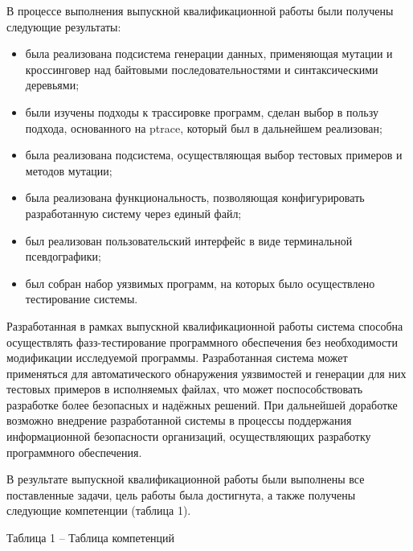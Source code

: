 \label{sec:conclusion}

В процессе выполнения выпускной квалификационной работы были получены следующие результаты:

\begin{itemize}
	\item была реализована подсистема генерации данных, применяющая мутации и кроссинговер над байтовыми последовательностями и синтаксическими деревьями;
	
	\item были изучены подходы к трассировке программ, сделан выбор в пользу подхода, основанного на ptrace, который был в дальнейшем реализован;
	
	\item была реализована подсистема, осуществляющая выбор тестовых примеров и методов мутации;
	
	\item была реализована функциональность, позволяющая конфигурировать разработанную систему через единый файл;
	
	\item был реализован пользовательский интерфейс в виде терминальной псевдографики;
	
	\item был собран набор уязвимых программ, на которых было осуществлено тестирование системы.
\end{itemize}

Разработанная в рамках выпускной квалификационной работы система способна осуществлять фазз-тестирование программного обеспечения без необходимости модификации исследуемой программы. Разработанная система  может применяться для автоматического обнаружения уязвимостей и генерации для них тестовых примеров в исполняемых файлах, что может поспособствовать разработке более безопасных и надёжных решений. При дальнейшей доработке возможно внедрение разработанной системы в процессы поддержания информационной безопасности организаций, осуществляющих разработку программного обеспечения.

В результате выпускной квалификационной работы были выполнены
все поставленные задачи, цель работы была достигнута, а также получены
следующие компетенции (таблица 1).

\noindent Таблица 1 -- Таблица компетенций
\vspace{5pt}


